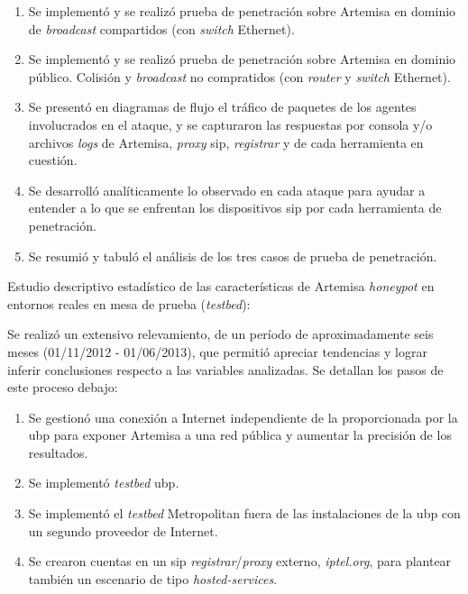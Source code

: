 \documentclass[a4paper,12pt]{report}
\begin{document}
\begin{enumerate}
\begin{enumerate}
  \item Se implementó y se realizó prueba de penetración sobre Artemisa en dominio de \emph{broadcast} 
compartidos (con \emph{switch} Ethernet).

  \item Se implementó y se realizó prueba de penetración sobre Artemisa en dominio público. Colisión 
y \emph{broadcast} no compratidos (con \emph{router} y \emph{switch} Ethernet).

  \item Se presentó en diagramas de flujo el tráfico de paquetes de los agentes involucrados en el ataque, 
y se capturaron las respuestas por consola y/o archivos \emph{logs} de Artemisa, \emph{proxy} \ac{sip}, \emph{registrar}
y de cada herramienta en cuestión.
  
  \item Se desarrolló analíticamente lo observado en cada ataque para ayudar a entender a lo que se 
enfrentan los dispositivos \ac{sip} por cada herramienta de penetración.
 
  \item Se resumió y tabuló el análisis de los tres casos de prueba de penetración.

\end{enumerate}

{\bf \item Estudio descriptivo estadístico de las características de Artemisa
\emph{honeypot} en entornos reales en mesa de prueba (\emph{testbed}):}

Se realizó un extensivo relevamiento, de un período de aproximadamente seis meses (01/11/2012
- 01/06/2013), que permitió apreciar tendencias y lograr inferir conclusiones respecto a las variables
 analizadas. Se detallan los pasos de este proceso debajo:

\begin{enumerate}

  \item Se gestionó una conexión a Internet independiente de la proporcionada por la \ac{ubp} para exponer 
Artemisa a una red pública y aumentar la precisión de los resultados.

  \item Se implementó \emph{testbed} \ac{ubp}.

  \item Se implementó el \emph{testbed} Metropolitan fuera de las instalaciones de la \ac{ubp} con un segundo
proveedor de Internet.

  \item Se crearon cuentas en un \ac{sip} \emph{registrar}/\emph{proxy} externo, \emph{iptel.org}, para plantear
también un escenario de tipo \emph{hosted-services}. 


\end{enumerate}
\end{enumerate}
\end{document}
